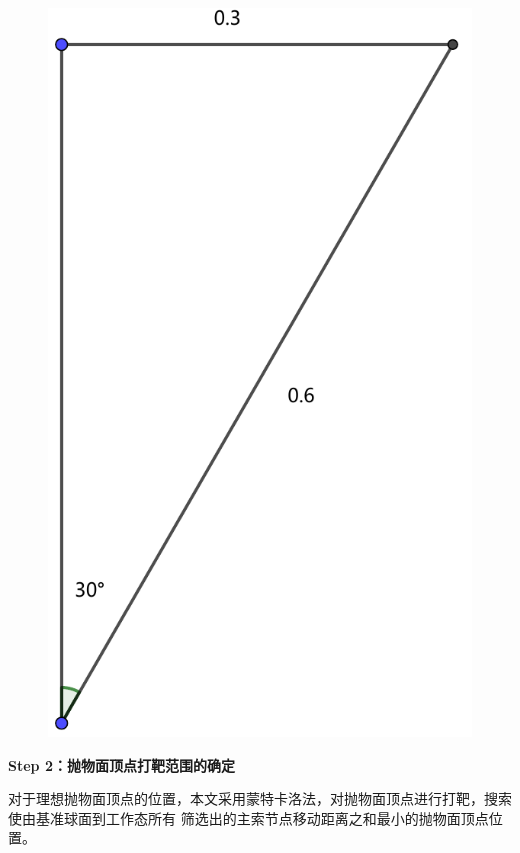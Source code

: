 \documentclass[withoutpreface,bwprint]{cumcmthesis} %
\begin{document}
\begin{figure}[!h]
\begin{minipage}[c]{0.48\textwidth}
    \end{minipage}
    \begin{minipage}[c]{0.48\textwidth}
        \centering
        \includegraphics[height=0.2\textheight]{angle2.pdf}
    \end{minipage}
    \caption{}
    \label{fig:range}
\end{figure}

\textbf{Step 2：抛物面顶点打靶范围的确定}

对于理想抛物面顶点的位置，本文采用蒙特卡洛法，对抛物面顶点进行打靶，搜索使由基准球面到工作态所有
筛选出的主索节点移动距离之和最小的抛物面顶点位置。
\end{document}
